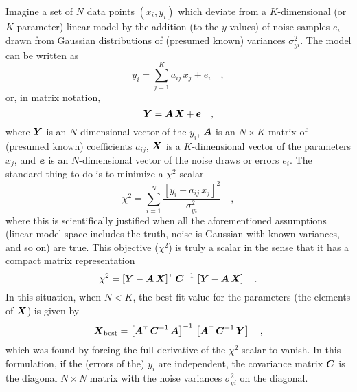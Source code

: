 \documentclass[12pt,twoside]{article}
\begin{document}
Imagine a set of $N$ data points $(x_i,y_i)$ which deviate from a
$K$-dimensional (or $K$-parameter) linear model by the addition (to
the $y$ values) of noise samples $e_i$ drawn from Gaussian
distributions of (presumed known) variances $\sigma_{yi}^2$.  The
model can be written as
\begin{equation}
y_i = \sum_{j=1}^K
  a_{ij}\,x_j + e_i
  \quad ,
\end{equation}
or, in matrix notation,
\begin{equation}
\boldsymbol{Y} = \boldsymbol{A}\,\boldsymbol{X} + \boldsymbol{e}
  \quad ,
\end{equation}
where $\boldsymbol{Y}$ is an $N$-dimensional vector of the $y_i$, $\boldsymbol{A}$ is an
$N\times K$ matrix of (presumed known) coefficients $a_{ij}$, $\boldsymbol{X}$ is
a $K$-dimensional vector of the parameters $x_j$, and $\boldsymbol{e}$ is an
$N$-dimensional vector of the noise draws or errors $e_i$.  The
standard thing to do is to minimize a $\chi^2$ scalar
\begin{equation}
\chi^2 = \sum_{i=1}^N
  \frac{\left[y_i - a_{ij}\,x_j\right]^2}{\sigma_{yi}^2}
  \quad ,
\end{equation}
where this is scientifically justified when all the aforementioned
assumptions (linear model space includes the truth, noise is Gaussian
with known variances, and so on) are true.  This objective ($\chi^2$)
is truly a scalar in the sense that it has a compact matrix
representation
\begin{equation}
\chi^2 = {\left[\boldsymbol{Y}-\boldsymbol{A}\,\boldsymbol{X}\right]}^{\scriptscriptstyle \top}
  \,{\boldsymbol{C}}^{-1}\,\left[\boldsymbol{Y}-\boldsymbol{A}\,\boldsymbol{X}\right]
  \quad .
\end{equation}
In this situation, when $N<K$, the best-fit value for the parameters
(the elements of $\boldsymbol{X}$) is given by
\begin{equation}
\boldsymbol{X}_{\mathrm{best}} = {\left[{\boldsymbol{A}}^{\scriptscriptstyle \top}\,{\boldsymbol{C}}^{-1}\,\boldsymbol{A}\right]}^{-1}
  \,\left[{\boldsymbol{A}}^{\scriptscriptstyle \top}\,{\boldsymbol{C}}^{-1}\,\boldsymbol{Y}\right]
  \quad ,
\end{equation}
which was found by forcing the full derivative of the $\chi^2$ scalar
to vanish.  In this formulation, if the (errors of the) $y_i$ are
independent, the covariance matrix $\boldsymbol{C}$ is the diagonal $N\times N$
matrix with the noise variances $\sigma_{yi}^2$ on the diagonal.
\end{document}

